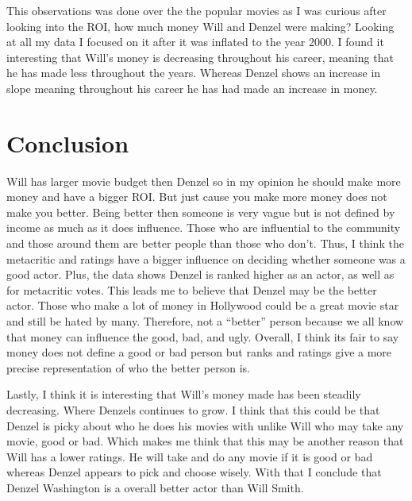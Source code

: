 \documentclass[]{article}
\begin{document}
This observations was done over the the popular movies as I was curious
after looking into the ROI, how much money Will and Denzel were making?
Looking at all my data I focused on it after it was inflated to the year
2000. I found it interesting that Will's money is decreasing throughout
his career, meaning that he has made less throughout the years. Whereas
Denzel shows an increase in slope meaning throughout his career he has
had made an increase in money.

\section{Conclusion}
\label{sec:conclusion}

Will has larger movie budget then Denzel so in my opinion he should make
more money and have a bigger ROI. But just cause you make more money
does not make you better. Being better then someone is very vague but is
not defined by income as much as it does influence. Those who are
influential to the community and those around them are better people
than those who don't. Thus, I think the metacritic and ratings have a
bigger influence on deciding whether someone was a good actor. Plus, the
data shows Denzel is ranked higher as an actor, as well as for
metacritic votes. This leads me to believe that Denzel may be the better
actor. Those who make a lot of money in Hollywood could be a great movie
star and still be hated by many. Therefore, not a ``better'' person
because we all know that money can influence the good, bad, and ugly.
Overall, I think its fair to say money does not define a good or bad
person but ranks and ratings give a more precise representation of who
the better person is.

Lastly, I think it is interesting that Will's money made has been
steadily decreasing. Where Denzels continues to grow. I think that this
could be that Denzel is picky about who he does his movies with unlike
Will who may take any movie, good or bad. Which makes me think that this
may be another reason that Will has a lower ratings. He will take and do
any movie if it is good or bad whereas Denzel appears to pick and choose
wisely. With that I conclude that Denzel Washington is a overall better
actor than Will Smith.






\newpage
\theendnotes

\newpage
\begin{auxmulticols}{2}
\singlespacing 


\end{auxmulticols}

\newpage
{
\hypersetup{linkcolor=black}
\setcounter{tocdepth}{3}
\tableofcontents
}
\end{document}
